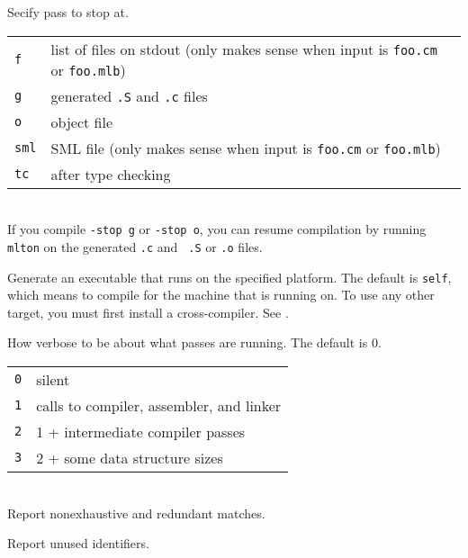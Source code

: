 \begin{description}
Secify pass to stop at.\\
\hspace*{0.5in}
\begin{tabular}{l|l}
\hline
{\tt f} & list of files on stdout (only makes sense when input is {\tt foo.cm} or {\tt foo.mlb})\\
{\tt g} & generated {\tt .S} and {\tt .c} files\\
{\tt o} & object file\\
{\tt sml} & SML file (only makes sense when input is {\tt foo.cm} or {\tt foo.mlb})\\
{\tt tc} & after type checking\\
\end{tabular}\\
If you compile {\tt -stop g} or {\tt -stop o}, you can resume
compilation by running {\tt mlton} on the generated {\tt .c} and {\tt
.S} or {\tt .o} files. 

Generate an executable that runs on the specified platform.  The default
is {\tt self}, which means to compile for the machine that {\mlton} is
running on.  To use any other target, you must first install a
cross-compiler.  See .

How verbose to be about what passes are running.  The default is 0.\\
\hspace*{0.5in}
\begin{tabular}{l|l}
\hline
{\tt 0} & silent\\
{\tt 1} & calls to compiler, assembler, and linker\\
{\tt 2} & 1 + intermediate compiler passes\\
{\tt 3} & 2 + some data structure sizes\\
\end{tabular}\\

Report nonexhaustive and redundant matches.

Report unused identifiers.

\end{description}


